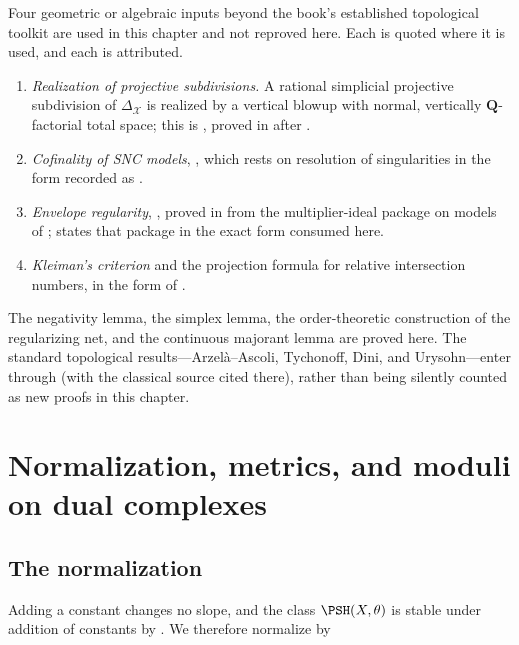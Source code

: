 Four geometric or algebraic inputs beyond the book's established
topological toolkit are used in this chapter and not reproved here.  Each is
quoted where it is used, and each is attributed.

\begin{enumerate}
\item \emph{Realization of projective subdivisions.}  A rational simplicial
projective subdivision of $\Delta_{\mathcal X}$ is realized by a vertical
blowup with normal, vertically $\mathbf Q$-factorial total space; this is
, proved in  after
\cite[Theorem~3.15]{BFJ16}.
\item \emph{Cofinality of SNC models}, , which rests
on resolution of singularities in the form recorded as
.
\item \emph{Envelope regularity}, , proved
in  from the multiplier-ideal package on models of
\cite[Appendix~B]{BFJ16};  states that package in
the exact form consumed here.
\item \emph{Kleiman's criterion} and the projection formula for relative
intersection numbers, in the form of
.
\end{enumerate}

The negativity lemma, the simplex lemma, the order-theoretic construction of
the regularizing net, and the continuous majorant lemma are proved here.
The standard topological results---Arzel\`a--Ascoli, Tychonoff, Dini, and
Urysohn---enter through  (with the
classical source cited there), rather than being silently counted as new
proofs in this chapter.

\section{Normalization, metrics, and moduli on dual complexes}
\label{sec:ch22-moduli}

\subsection{The normalization}

Adding a constant changes no slope, and the class $\PSH(X,\theta)$ is
stable under addition of constants by
.  We therefore normalize by


